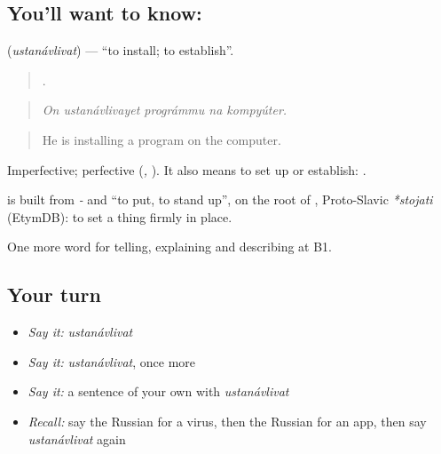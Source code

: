 \subsection*{You'll want to know: }
\textbf{} (\emph{ustanávlivat}) — \textquotedblleft{}to install; to establish\textquotedblright{}.

\begin{quote}
    .
\end{quote}

\begin{quote}
\emph{On ustanávlivayet prográmmu na kompyúter.}
\end{quote}

\begin{quote}
He is installing a program on the computer.
\end{quote}

Imperfective; perfective \emph{} (\emph{, }). It also means to set up or establish: \emph{ }.

\begin{cousinweb}
\textbf{} is built from \emph{-} and \emph{} \textquotedblleft{}to put, to stand up\textquotedblright{}, on the root of \emph{}, Proto-Slavic \emph{*stojati} (EtymDB): to set a thing firmly in place.
\end{cousinweb}

\begin{grammarlens}[title={What you've built}]
One more word for telling, explaining and describing at B1.
\end{grammarlens}

\subsection*{Your turn}
\begin{itemize}
\raggedright
  \item \emph{Say it:} \emph{ustanávlivat}
  \item \emph{Say it:} \emph{ustanávlivat}, once more
  \item \emph{Say it:} a sentence of your own with \emph{ustanávlivat}
  \item \emph{Recall:} say the Russian for a virus, then the Russian for an app, then say \emph{ustanávlivat} again
\end{itemize}

